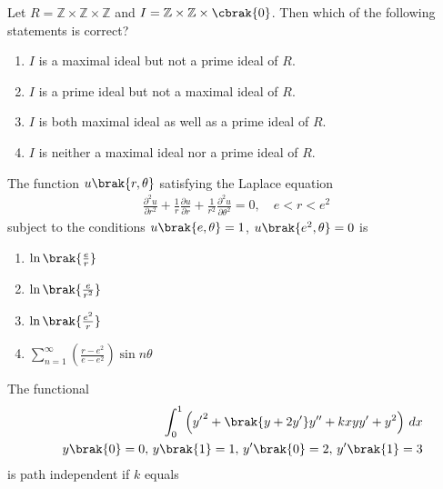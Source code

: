 \iffalse
 \chapter{2012}
 \author{AI24BTECH11017}
 \section{ma}
 \fi

	\item Let $R = \mathbb{Z} \times \mathbb{Z} \times \mathbb{Z}$ and $I = \mathbb{Z} \times \mathbb{Z} \times \cbrak{0}$.  Then which of the following statements is 
correct?

\begin{enumerate} \item $I$ is a maximal ideal but not a prime ideal of $R$. \item $I$ is a prime ideal but not a maximal ideal of $R$. \item $I$ is both maximal ideal as well 
    as a prime ideal of $R$. \item $I$ is neither a maximal ideal nor a prime ideal of $R$.
\end{enumerate}

\item The function $u \brak{r, \theta}$ satisfying the Laplace equation \begin{align*} \frac{\partial^2 u}{\partial r^2} + \frac{1}{r} \frac{\partial u}{\partial r} + 
\frac{1}{r^2} \frac{\partial^2 u}{\partial \theta^2} = 0, \quad e < r < e^2 \end{align*} subject to the conditions $u \brak{e, \theta} = 1$, $u \brak{e^2, \theta} = 0$ is 
\begin{enumerate}
    \item $\ln \brak{\frac{e}{r}}$ \item $\ln \brak{\frac{e}{r^2}}$ \item $\ln \brak{\frac{e^2}{r}}$ \item $\sum_{n=1}^{\infty} \left( \frac{r - e^2}{e - e^2} \right) \sin 
    n\theta$
\end{enumerate}

\item The functional \begin{align*}
	\int_{0}^{1} \left( {y^{\prime}}^2 + \brak{y + 2y^{\prime}} y^{\prime \prime} + kxyy^{\prime} + y^2 \right) \, dx \\ \quad y \brak{0} = 0, \, y \brak{1} = 1, \, 
	y^\prime \brak{0} = 2, \, y^\prime \brak{1} = 3
\end{align*} is path independent if $k$ equals

